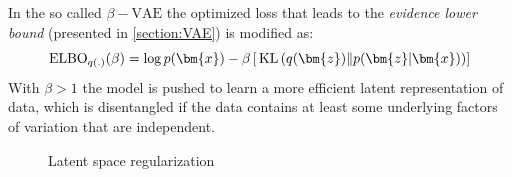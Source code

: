 In the so called $\beta-\textrm{VAE}$ the optimized loss that leads to the \textit{evidence lower bound} (presented in \cref{section:VAE}) is modified as:
\begin{equation}
    \mathrm{ELBO}_{q(.)}(\beta) = \log p(\bm{x}) - \beta \left[ \KLD{q(\bm{z})}{p(\bm{z}|\bm{x})} \right]
\end{equation}
With $\beta>1$ the model is pushed to learn a more efficient latent representation of data, which is disentangled if the data contains at least some underlying factors of variation that are independent.
%
\begin{figure}
    \centering
    \caption{ Latent space regularization } 
    \label{fig:step1_ls_regularization}
\end{figure}
